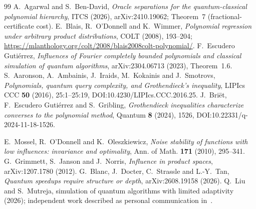 \documentclass[11pt]{article}
\numberwithin{equation}{section}
\theoremstyle{remark}
\begin{document}
\begin{thebibliography}{99}
 A.~Agarwal and S.~Ben-David, \emph{Oracle separations for the quantum-classical polynomial hierarchy}, ITCS (2026), arXiv:2410.19062; Theorem~7 (fractional-certificate cost).
 E.~Blais, R.~O'Donnell and K.~Wimmer, \emph{Polynomial regression under arbitrary product distributions}, COLT (2008), 193--204; \url{https://mlanthology.org/colt/2008/blais2008colt-polynomial/}.
 F.~Escudero Guti\'errez, \emph{Influences of Fourier completely bounded polynomials and classical simulation of quantum algorithms}, arXiv:2304.06713 (2023), Theorem~1.6.
 S.~Aaronson, A.~Ambainis, J.~Iraids, M.~Kokainis and J.~Smotrovs,
\emph{Polynomials, quantum query complexity, and Grothendieck's inequality},
LIPIcs CCC \textbf{50} (2016), 25:1--25:19, DOI:10.4230/LIPIcs.CCC.2016.25.
 J.~Bri\"et, F.~Escudero Guti\'errez and S.~Gribling,
\emph{Grothendieck inequalities characterize converses to the polynomial method},
Quantum \textbf{8} (2024), 1526, DOI:10.22331/q-2024-11-18-1526.


 E.~Mossel, R.~O'Donnell and K.~Oleszkiewicz,
 \emph{Noise stability of functions with low influences: invariance and optimality},
 Ann. of Math. \textbf{171} (2010), 295--341.
 G.~Grimmett, S.~Janson and J.~Norris,
 \emph{Influence in product spaces}, arXiv:1207.1780 (2012).
 G.~Blanc, J.~Docter, C.~Strassle and L.-Y.~Tan,
 \emph{Quantum speedups require structure or depth}, arXiv:2608.19158 (2026).
 Q.~Liu and S.~Mutreja, simulation of quantum algorithms with limited adaptivity (2026); independent work described as personal communication in~\cite{BDSTparallel26}.


\end{thebibliography}
\end{document}
